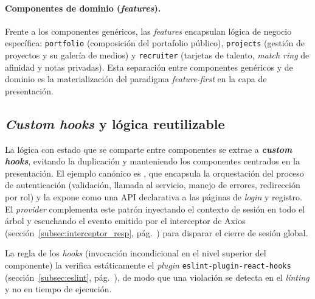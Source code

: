 \paragraph{Componentes de dominio (\textit{features}).} Frente a los componentes
genéricos, las \textit{features} encapsulan lógica de negocio específica: \texttt{portfolio}
(composición del portafolio público), \texttt{projects} (gestión de proyectos y su
galería de medios) y \texttt{recruiter} (tarjetas de talento, \textit{match ring} de
afinidad y notas privadas). Esta separación entre componentes genéricos y de dominio es la
materialización del paradigma \textit{feature-first} en la capa de presentación.

\subsection{\textit{Custom hooks} y lógica reutilizable}
\label{subsec:hooks}

La lógica con estado que se comparte entre componentes se extrae a \textbf{\textit{custom
hooks}}, evitando la duplicación y manteniendo los componentes centrados en la
presentación. El ejemplo canónico es , que encapsula la orquestación
del proceso de autenticación (validación, llamada al servicio, manejo de errores,
redirección por rol) y la expone como una API declarativa a las páginas de \textit{login}
y registro. El \textit{provider}  complementa este patrón
inyectando el contexto de sesión en todo el árbol y escuchando el evento
 emitido por el interceptor de Axios
(sección~\ref{subsec:interceptor_resp}, pág.~\pageref{subsec:interceptor_resp}) para
disparar el cierre de sesión global.

\begin{NotaTecnica}
La regla de los \textit{hooks} (invocación incondicional en el nivel superior del
componente) la verifica estáticamente el \textit{plugin} \texttt{eslint-plugin-react-hooks}
(sección~\ref{subsec:eslint}, pág.~\pageref{subsec:eslint}), de modo que una violación se
detecta en el \textit{linting} y no en tiempo de ejecución.
\end{NotaTecnica}
